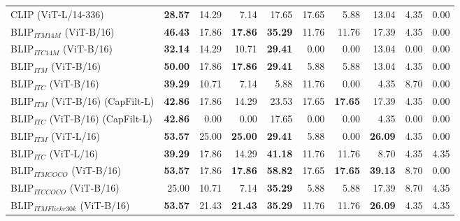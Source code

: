 \begin{table*}
\begin{adjustbox}{max width=\textwidth}
\begin{tabular}{l|rrr|rrr|rrr}
 CLIP (ViT-L/14-336)                 & \textbf{28.57} & 14.29          & 7.14           & 17.65          & 17.65          & 5.88           & 13.04          & 4.35           & 0.00           \\
 BLIP$_{ITM 14M}$ (ViT-B/16)         & \textbf{46.43} & 17.86          & \textbf{17.86} & \textbf{35.29} & 11.76          & 11.76          & 17.39          & 4.35           & 0.00           \\
 BLIP$_{ITC 14M}$ (ViT-B/16)         & \textbf{32.14} & 14.29          & 10.71          & \textbf{29.41} & 0.00           & 0.00           & 13.04          & 0.00           & 0.00           \\
 BLIP$_{ITM}$ (ViT-B/16)             & \textbf{50.00} & 17.86          & \textbf{17.86} & \textbf{29.41} & 5.88           & 5.88           & 13.04          & 4.35           & 0.00           \\
 BLIP$_{ITC}$ (ViT-B/16)             & \textbf{39.29} & 10.71          & 7.14           & 5.88           & 11.76          & 0.00           & 4.35           & 8.70           & 0.00           \\
 BLIP$_{ITM}$ (ViT-B/16) (CapFilt-L) & \textbf{42.86} & 17.86          & 14.29          & 23.53          & 17.65          & \textbf{17.65} & 17.39          & 4.35           & 0.00           \\
 BLIP$_{ITC}$ (ViT-B/16) (CapFilt-L) & \textbf{42.86} & 0.00           & 0.00           & 17.65          & 0.00           & 0.00           & 4.35           & 0.00           & 0.00           \\
 BLIP$_{ITM}$ (ViT-L/16)             & \textbf{53.57} & 25.00          & \textbf{25.00} & \textbf{29.41} & 5.88           & 0.00           & \textbf{26.09} & 4.35           & 0.00           \\
 BLIP$_{ITC}$ (ViT-L/16)             & \textbf{39.29} & 17.86          & 14.29          & \textbf{41.18} & 11.76          & 11.76          & 8.70           & 4.35           & 4.35           \\
 BLIP$_{ITM COCO}$ (ViT-B/16)        & \textbf{53.57} & 17.86          & \textbf{17.86} & \textbf{58.82} & 17.65          & \textbf{17.65} & \textbf{39.13} & 8.70           & 0.00           \\
 BLIP$_{ITC COCO}$ (ViT-B/16)        & 25.00          & 10.71          & 7.14           & \textbf{35.29} & 5.88           & 5.88           & 17.39          & 8.70           & 4.35           \\
 BLIP$_{ITM Flickr30k}$ (ViT-B/16)   & \textbf{53.57} & 21.43          & \textbf{21.43} & \textbf{35.29} & 11.76          & 11.76          & \textbf{26.09} & 4.35           & 4.35           \\

\end{tabular}
\end{adjustbox}
\end{table*}
